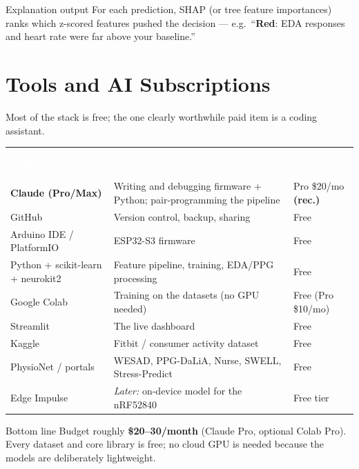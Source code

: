 \documentclass[11pt]{article}
\newcommand{\hd}[1]{\textbf{\sffamily\textcolor{white}{#1}}}
\begin{document}
\begin{callout}[nsgreen]{Explanation output}
For each prediction, SHAP (or tree feature importances) ranks which z-scored features pushed the
decision --- e.g.\ ``\textcolor{nsred}{\textbf{Red}}: EDA responses and heart rate were far above your
baseline.''
\end{callout}

\section{Tools and AI Subscriptions}\label{sec:tools}

Most of the stack is free; the one clearly worthwhile paid item is a coding assistant.

{
\begin{tabularx}{\linewidth}{@{}L Y L@{}}
 \hd{Tool} & \hd{Purpose} & \hd{Cost (USD)} \\
\textbf{Claude (Pro/Max)} & Writing and debugging firmware + Python; pair-programming the pipeline & Pro \$20/mo \textbf{(rec.)} \\
GitHub & Version control, backup, sharing & Free \\
Arduino IDE / PlatformIO & ESP32-S3 firmware & Free \\
Python + scikit-learn + neurokit2 & Feature pipeline, training, EDA/PPG processing & Free \\
Google Colab & Training on the datasets (no GPU needed) & Free (Pro \$10/mo) \\
Streamlit & The live dashboard & Free \\
Kaggle & Fitbit / consumer activity dataset & Free \\
PhysioNet / portals & WESAD, PPG-DaLiA, Nurse, SWELL, Stress-Predict & Free \\
Edge Impulse & \emph{Later:} on-device model for the nRF52840 & Free tier \\
\end{tabularx}}

\begin{callout}[nsblue]{Bottom line}
Budget roughly \textbf{\$20--30/month} (Claude Pro, optional Colab Pro). Every dataset and core
library is free; no cloud GPU is needed because the models are deliberately lightweight.
\end{callout}

\end{document}
